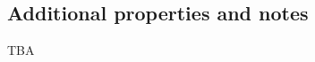 \documentclass[sigconf]{acmart}
\theoremstyle{remark}
\begin{document}










\subsection{Additional properties and notes}
 
 TBA



\end{document}
